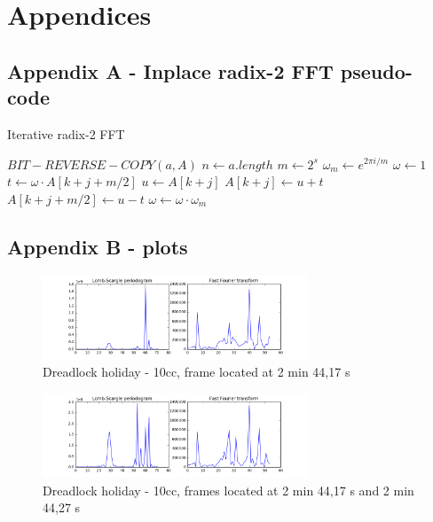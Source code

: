 \documentclass[letterpaper]{article}
\begin{document}
\footnotesize



\newpage

\section{Appendices}

\subsection{Appendix A - Inplace radix-2 FFT pseudo-code}

\begin{algorithm}
\caption{Iterative radix-2 FFT}\label{fft}
\begin{algorithmic}[1]
\State $BIT-REVERSE-COPY(a, A)$
\State $n \gets a.length$
	\State $m \gets 2^{s}$
	\State $\omega_m \gets e^{2\pi i / m} $
		\State $\omega \gets 1$
			\State $t \gets \omega \cdot A[k + j + m/2]$
			\State $u \gets A[k + j]$
			\State $A[k + j] \gets u + t$
			\State $A[k + j + m/2] \gets u - t$
			\State $\omega \gets \omega \cdot \omega_m$
		\EndFor
	\EndFor
\EndFor
\EndProcedure
\end{algorithmic}
\end{algorithm}

\subsection{Appendix B - plots}

\begin{figure}[h!]
\begin{center}
\includegraphics[width=3.1in,angle=0]{imgs/1frame.png}
\caption{Dreadlock holiday - 10cc, frame located at 2 min 44,17 s}
\label{}
\end{center}
\end{figure}

\begin{figure}[h!]
\begin{center}
\includegraphics[width=3.1in,angle=0]{imgs/2frames.png}
\caption{Dreadlock holiday - 10cc, frames located at 2 min 44,17 s and 2 min 44,27 s}
\label{}
\end{center}
\end{figure}
\end{document}
